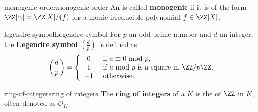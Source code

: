 \begin{topic}{monogenic-order}{monogenic order}
    An  is called \textbf{monogenic} if it is of the form $\ZZ[\alpha] = \ZZ[X] / (f)$ for a monic irreducible polynomial $f \in \ZZ[X]$.
\end{topic}

\begin{topic}{legendre-symbol}{Legendre symbol}
    For $p$ an odd prime number and $d$ an integer, the \textbf{Legendre symbol} $\left(\tfrac{d}{p}\right)$ is defined as
    \[ \left(\frac{d}{p}\right) = \left\{ \begin{array}{cl}
        0 & \text{ if $a \equiv 0 \text{ mod } p$} , \\
        1 & \text{ if $a \text{ mod } p$ is a square in $\ZZ/p\ZZ$} ,  \\
        -1 & \text{ otherwise} .
    \end{array} \right. \]
\end{topic}

\begin{topic}{ring-of-integers}{ring of integers}
    The \textbf{ring of integers} of a  $K$ is the  of $\ZZ$ in $K$, often denoted as $\mathcal{O}_K$. %
\end{topic}
